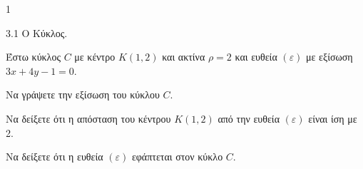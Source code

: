 \begin{ylh}{1}
    \item 3.1 Ο Κύκλος.
\end{ylh}
Έστω κύκλος $C$ με κέντρο $K(1,2)$ και ακτίνα $\rho=2$ και ευθεία $(\varepsilon)$ με εξίσωση $3x+4y-1=0$.
\begin{alist}
\item Να γράψετε την εξίσωση του κύκλου $C$. 
\item Να δείξετε ότι η απόσταση του κέντρου $K(1,2)$ από την ευθεία $(\varepsilon)$ είναι ίση με 2. 
\item Να δείξετε ότι η ευθεία $(\varepsilon)$ εφάπτεται στον κύκλο $C$. 
\end{alist}